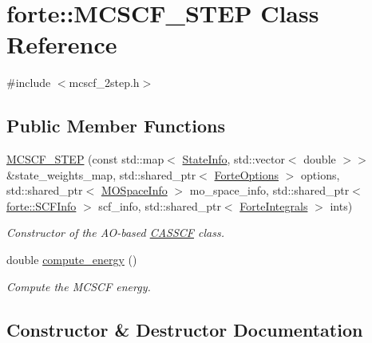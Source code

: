 \hypertarget{classforte_1_1_m_c_s_c_f__2_s_t_e_p}{}\section{forte\+:\+:M\+C\+S\+C\+F\+\_\+S\+T\+EP Class Reference}
\label{classforte_1_1_m_c_s_c_f__2_s_t_e_p}


{\ttfamily \#include $<$mcscf\+\_\+2step.\+h$>$}

\subsection*{Public Member Functions}
\begin{DoxyCompactItemize}
\item 
\mbox{\hyperlink{classforte_1_1_m_c_s_c_f__2_s_t_e_p_a62cf1dcfa0b09d87ad929055e9017a78}{M\+C\+S\+C\+F\+\_\+S\+T\+EP}} (const std\+::map$<$ \mbox{\hyperlink{classforte_1_1_state_info}{State\+Info}}, std\+::vector$<$ double $>$$>$ \&state\+\_\+weights\+\_\+map, std\+::shared\+\_\+ptr$<$ \mbox{\hyperlink{classforte_1_1_forte_options}{Forte\+Options}} $>$ options, std\+::shared\+\_\+ptr$<$ \mbox{\hyperlink{classforte_1_1_m_o_space_info}{M\+O\+Space\+Info}} $>$ mo\+\_\+space\+\_\+info, std\+::shared\+\_\+ptr$<$ \mbox{\hyperlink{classforte_1_1_s_c_f_info}{forte\+::\+S\+C\+F\+Info}} $>$ scf\+\_\+info, std\+::shared\+\_\+ptr$<$ \mbox{\hyperlink{classforte_1_1_forte_integrals}{Forte\+Integrals}} $>$ ints)
\begin{DoxyCompactList}\small\item\em Constructor of the A\+O-\/based \mbox{\hyperlink{classforte_1_1_c_a_s_s_c_f}{C\+A\+S\+S\+CF}} class. \end{DoxyCompactList}\item 
double \mbox{\hyperlink{classforte_1_1_m_c_s_c_f__2_s_t_e_p_acbb534fe26a165a5385044879e6c1ae2}{compute\+\_\+energy}} ()
\begin{DoxyCompactList}\small\item\em Compute the M\+C\+S\+CF energy. \end{DoxyCompactList}\end{DoxyCompactItemize}


\subsection{Constructor \& Destructor Documentation}
\mbox{\label{classforte_1_1_m_c_s_c_f__2_s_t_e_p_a62cf1dcfa0b09d87ad929055e9017a78}} 
